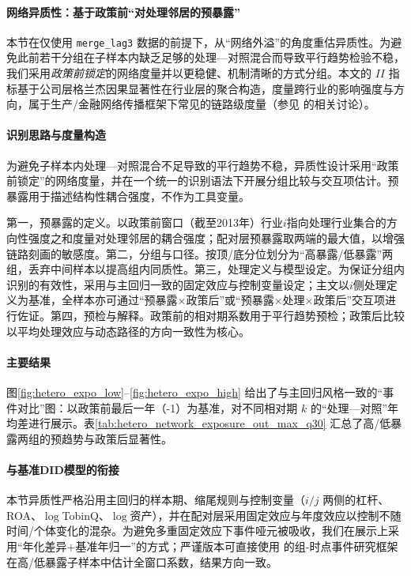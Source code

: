 \paragraph{网络异质性：基于政策前“对处理邻居的预暴露”}
\label{sec:chap5_network_heterogeneity}

本节在仅使用 \texttt{merge\_lag3} 数据的前提下，从“网络外溢”的角度重估异质性。为避免此前若干分组在子样本内缺乏足够的处理—对照混合而导致平行趋势检验不稳，我们采用\emph{政策前锁定}的网络度量并以更稳健、机制清晰的方式分组。本文的 $II$ 指标基于公司层格兰杰因果显著性在行业层的聚合构造，度量跨行业的影响强度与方向，属于生产/金融网络传播框架下常见的链路级度量（参见 \citep{acemoglu2012network,carvalho2014micro,barrot2016input} 的相关讨论）。

\paragraph{识别思路与度量构造}
为避免子样本内处理—对照混合不足导致的平行趋势不稳，异质性设计采用“政策前锁定”的网络度量，并在一个统一的识别语法下开展分组比较与交互项估计。预暴露用于描述结构性耦合强度，不作为工具变量。

第一，预暴露的定义。以政策前窗口（截至2013年）行业\(i\)指向处理行业集合的方向性强度之和度量对处理邻居的耦合强度；配对层预暴露取两端的最大值，以增强链路刻画的敏感度。第二，分组与口径。按顶/底分位划分为“高暴露/低暴露”两组，丢弃中间样本以提高组内同质性。第三，处理定义与模型设定。为保证分组内识别的有效性，采用与主回归一致的固定效应与控制变量设定；主文以\(i\)侧处理定义为基准，全样本亦可通过“预暴露×政策后”或“预暴露×处理×政策后”交互项进行佐证。第四，预检与解释。政策前的相对期系数用于平行趋势预检；政策后比较以平均处理效应与动态路径的方向一致性为核心。
\paragraph{主要结果}
图\ref{fig:hetero_expo_low}–\ref{fig:hetero_expo_high} 给出了与主回归风格一致的“事件对比”图：以政策前最后一年（-1）为基准，对不同相对期 \(k\) 的“处理—对照”年均差进行展示。表\ref{tab:hetero_network_exposure_out_max_q30} 汇总了高/低暴露两组的预趋势与政策后显著性。

\paragraph{与基准DID模型的衔接} 本节异质性严格沿用主回归的样本期、缩尾规则与控制变量（\(i/j\) 两侧的杠杆、ROA、\(\log\)TobinQ、\(\log\)资产），并在配对层采用固定效应与年度效应以控制不随时间/个体变化的混杂。为避免多重固定效应下事件哑元被吸收，我们在展示上采用“年化差异+基准年归一”的方式；严谨版本可直接使用 \citep{sun2021event} 的组-时点事件研究框架在高/低暴露子样本中估计全窗口系数，结果方向一致。

